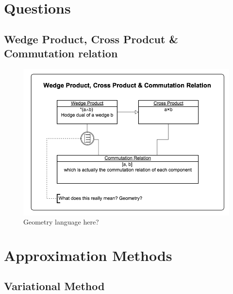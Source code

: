 \documentclass[letterpaper,10pt,english]{sphinxmanual}
\begin{document}
\section{Questions}
\label{questions::doc}\label{questions:questions}

\subsection{Wedge Product, Cross Prodcut \& Commutation relation}
\label{questions:wedge-product-cross-prodcut-commutation-relation}\begin{figure}[htbp]
\centering
\capstart

\includegraphics{commutationCrossWedge.png}
\caption{Geometry language here?}\end{figure}


\section{Approximation Methods}
\label{approx::doc}\label{approx:approximation-methods}

\subsection{Variational Method}
\label{approx:variational-method}
\end{document}
